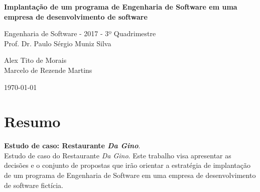 \documentclass[11pt,twoside,a4paper]{book}
\begin{document}
\frontmatter
\fancyhead[RO]{{\footnotesize\rightmark}\hspace{2em}\thepage}
\setcounter{tocdepth}{2}
\fancyhead[LE]{\thepage\hspace{2em}\footnotesize{\leftmark}}
\fancyhead[RE,LO]{}
\fancyhead[RO]{{\footnotesize\rightmark}\hspace{2em}\thepage}

\onehalfspacing  %

\thispagestyle{empty}
\begin{center}
    \vspace*{2.3cm}
    \textbf{\Large{Implantação de um programa de Engenharia de Software em uma empresa de desenvolvimento de software}}\\
    \vspace*{1.2cm}

    \Large{Engenharia de Software - 2017 - 3º Quadrimestre}\\
	\Large{Prof. Dr. Paulo Sérgio Muniz Silva}

    \vspace*{1.2cm}
    \Large{Alex Tito de Morais}\\
    \Large{Marcelo de Rezende Martins}

    \vskip 0.5cm
    \normalsize{\today}
\end{center}






\chapter*{Resumo}

\noindent  \textbf{Estudo de caso: Restaurante \textit{Da Gino}}.\\



Estudo de caso do Restaurante \textit{Da Gino}. Este trabalho visa apresentar as decisões e o conjunto de propostas que irão orientar a estratégia de implantação de um programa de Engenharia de Software em uma empresa de desenvolvimento de software fictícia.\\ 
\end{document}
